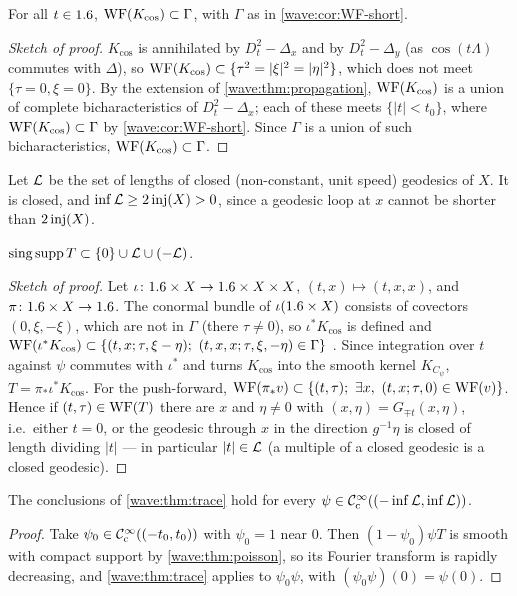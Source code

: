 \begin{proposition}\label{wave:prop:WF-kernel}
For all $t\in1.6$, $\operatorname{WF}(K_{\cos})\subset\Gamma$, with $\Gamma$ as in \cref{wave:cor:WF-short}.
\end{proposition}
\begin{proof}[Sketch of proof]
$K_{\cos}$ is annihilated by $D_t^2-\Delta_x$ and by $D_t^2-\Delta_y$ (as $\cos(t\Lambda)$
commutes with $\Delta$), so $\operatorname{WF}(K_{\cos})\subset\{\tau^2=|\xi|^2=|\eta|^2\}$, which does not meet
$\{\tau=0,\xi=0\}$. By the extension of \cref{wave:thm:propagation}, $\operatorname{WF}(K_{\cos})$ is a
union of complete bicharacteristics of $D_t^2-\Delta_x$; each of these meets
$\{|t|<t_0\}$, where $\operatorname{WF}(K_{\cos})\subset\Gamma$ by \cref{wave:cor:WF-short}. Since $\Gamma$ is a union of
such bicharacteristics, $\operatorname{WF}(K_{\cos})\subset\Gamma$.
\end{proof}

Let $\mathcal{L}$ be the set of lengths of closed (non-constant, unit speed) geodesics of
$X$. It is closed, and $\inf\mathcal{L}\ge2\operatorname{inj}(X)>0$, since a geodesic loop at $x$ cannot be
shorter than $2\operatorname{inj}(X)$.

\begin{theorem}\label{wave:thm:poisson}
$\operatorname{sing\,supp} T\subset\{0\}\cup\mathcal{L}\cup(-\mathcal{L})$.
\end{theorem}
\begin{proof}[Sketch of proof]
Let $\iota\colon1.6\times X\to1.6\times X\times X$, $(t,x)\mapsto(t,x,x)$, and $\pi\colon1.6\times X\to1.6$. The
conormal bundle of $\iota(1.6\times X)$ consists of covectors $(0,\xi,-\xi)$, which are not in
$\Gamma$ (there $\tau\ne0$), so $\iota^*K_{\cos}$ is defined and
$\WF(\iota^*K_{\cos})\subset\{(t,x;\tau,\xi-\eta);\ (t,x,x;\tau,\xi,-\eta)\in\Gamma\}$
\cite[Section~8.2]{Hormander-I}. Since integration over $t$ against $\psi$ commutes with
$\iota^*$ and turns $K_{\cos}$ into the smooth kernel $K_{C_\psi}$, $T=\pi_*\iota^*K_{\cos}$.
For the push-forward, $\WF(\pi_*v)\subset\{(t,\tau);\ \exists x,\ (t,x;\tau,0)\in\WF(v)\}$. Hence if
$(t,\tau)\in\operatorname{WF}(T)$ there are $x$ and $\eta\ne0$ with $(x,\eta)=G_{\mp t}(x,\eta)$, i.e.\ either
$t=0$, or the geodesic through $x$ in the direction $g^{-1}\eta$ is closed of length dividing
$|t|$ — in particular $|t|\in\mathcal{L}$ (a multiple of a closed geodesic is a closed
geodesic).
\end{proof}

\begin{corollary}\label{wave:cor:trace-extended}
The conclusions of \cref{wave:thm:trace} hold for every $\psi\in\mathcal{C}^\infty_{\mathrm{c}}((-\inf\mathcal{L},\inf\mathcal{L}))$.
\end{corollary}
\begin{proof}
Take $\psi_0\in\mathcal{C}^\infty_{\mathrm{c}}((-t_0,t_0))$ with $\psi_0=1$ near $0$. Then $(1-\psi_0)\psi T$ is smooth
with compact support by \cref{wave:thm:poisson}, so its Fourier transform is
rapidly decreasing, and \cref{wave:thm:trace} applies to $\psi_0\psi$, with $(\psi_0\psi)(0)=\psi(0)$.
\end{proof}

